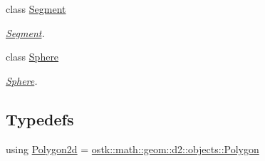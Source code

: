 \begin{DoxyCompactItemize}
class \hyperlink{classostk_1_1math_1_1geom_1_1d3_1_1objects_1_1_segment}{Segment}
\begin{DoxyCompactList}\small\item\em \hyperlink{classostk_1_1math_1_1geom_1_1d3_1_1objects_1_1_segment}{Segment}. \end{DoxyCompactList}\item 
class \hyperlink{classostk_1_1math_1_1geom_1_1d3_1_1objects_1_1_sphere}{Sphere}
\begin{DoxyCompactList}\small\item\em \hyperlink{classostk_1_1math_1_1geom_1_1d3_1_1objects_1_1_sphere}{Sphere}. \end{DoxyCompactList}\end{DoxyCompactItemize}
\subsection*{Typedefs}
\begin{DoxyCompactItemize}
\item 
using \hyperlink{namespaceostk_1_1math_1_1geom_1_1d3_1_1objects_ab51647b491a750a403dcaca4c2254905}{Polygon2d} = \hyperlink{classostk_1_1math_1_1geom_1_1d2_1_1objects_1_1_polygon}{ostk\+::math\+::geom\+::d2\+::objects\+::\+Polygon}
\end{DoxyCompactItemize}
